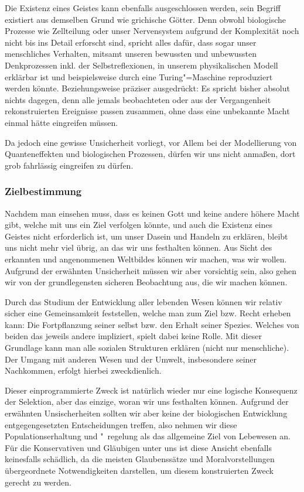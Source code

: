 Die Existenz eines Geistes kann ebenfalls ausgeschlossen werden, sein Begriff existiert aus demselben Grund wie grichische Götter. Denn obwohl biologische Prozesse wie Zellteilung oder unser Nervensystem aufgrund der Komplexität noch nicht bis ins Detail erforscht sind, spricht alles dafür, dass sogar unser menschliches Verhalten, mitsamt unseren bewussten und unbewussten Denkprozessen inkl. der Selbstreflexionen, in unserem physikalischen Modell erklärbar ist und beispielsweise durch eine Turing"=Maschine reproduziert werden könnte. Beziehungsweise präziser ausgedrückt: Es spricht bisher absolut nichts dagegen, denn alle jemals beobachteten oder aus der Vergangenheit rekonstruierten Ereignisse passen zusammen, ohne dass eine unbekannte Macht einmal hätte eingreifen müssen.

Da jedoch eine gewisse Unsicherheit vorliegt, vor Allem bei der Modellierung von Quanteneffekten und biologischen Prozessen, dürfen wir uns nicht anmaßen, dort grob fahrlässig eingreifen zu dürfen.

\subsubsection{Zielbestimmung}

Nachdem man einsehen muss, dass es keinen Gott und keine andere höhere Macht gibt, welche mit uns ein Ziel verfolgen könnte, und auch die Existenz eines Geistes nicht erforderlich ist, um unser Dasein und Handeln zu erklären, bleibt uns nicht mehr viel übrig, an das wir uns festhalten können. Aus Sicht des erkannten und angenommenen Weltbildes können wir machen, was wir wollen. Aufgrund der erwähnten Unsicherheit müssen wir aber vorsichtig sein, also gehen wir von der grundlegensten sicheren Beobachtung aus, die wir machen können.

Durch das Studium der Entwicklung aller lebenden Wesen können wir relativ sicher eine Gemeinsamkeit feststellen, welche man zum Ziel bzw. Recht erheben kann: Die Fortpflanzung seiner selbst bzw. den Erhalt seiner Spezies. Welches von beiden das jeweils andere impliziert, spielt dabei keine Rolle. Mit dieser Grundlage kann man alle sozialen Strukturen erklären (nicht nur menschliche). Der Umgang mit anderen Wesen und der Umwelt, insbesondere seiner Nachkommen, erfolgt hierbei zweckdienlich.

Dieser einprogrammierte Zweck ist natürlich wieder nur eine logische Konsequenz der Selektion, aber das einzige, woran wir uns festhalten können. Aufgrund der erwähnten Unsischerheiten sollten wir aber keine der biologischen Entwicklung entgegengesetzten Entscheidungen treffen, also nehmen wir diese Populationserhaltung und "~regelung als das allgemeine Ziel von Lebewesen an. Für die Konservativen und Gläubigen unter uns ist diese Ansicht ebenfalls keinesfalls schädlich, da die meisten Glaubenssätze und Moralvorstellungen übergeordnete Notwendigkeiten darstellen, um diesem konstruierten Zweck gerecht zu werden.

